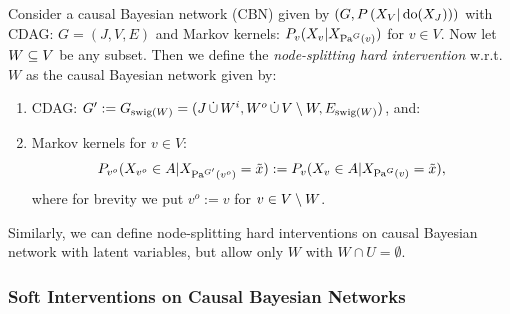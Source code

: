 \begin{Def}
    Consider a causal Bayesian network (CBN) given by $\left ( G, P\left ( X_V|\operatorname{do}(X_J)\right )\right )$ 
    with CDAG: $G=(J,V,E)$ and Markov kernels: $P_v(X_v|X_{\mathrm{Pa}^G(v)})$ for $v \in V$.
    Now let  $ W \subseteq V$ be any subset.
    Then we define the \emph{node-splitting hard intervention} w.r.t.\ $W$ as the causal Bayesian network given by:
    \begin{enumerate}
        \item CDAG: $G':=G_{\mathrm{swig}(W)} = (J \,\dot{\cup}\, W^i, W^o \,\dot{\cup}\, V\setminus W,E_{\mathrm{swig}(W)})$, and:
        \item Markov kernels for $v \in V$:
            \[ P_{v^o}(X_{v^o} \in A| X_{\mathrm{Pa}^{G'}(v^o)}=\tilde x) := P_v(X_v \in A|X_{\mathrm{Pa}^G(v)}=\tilde x), \]
         where for brevity we put $v^o:=v$ for $v \in V \setminus W$.
    \end{enumerate}
\end{Def}

\begin{Rem}
    Similarly, we can define node-splitting hard interventions on causal Bayesian network with latent variables, 
    but allow only $W$ with $W \cap U = \emptyset$.
\end{Rem}


\subsubsection{Soft Interventions on Causal Bayesian Networks}

